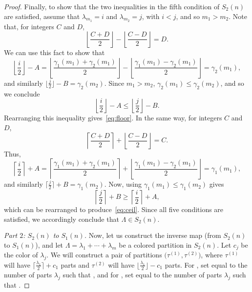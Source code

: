 \documentclass[pdftex]{sigma}
\numberwithin{equation}{section}
\theoremstyle{definition}
\begin{document}
\begin{proof}
Finally, to show that the two inequalities in the fifth condition of $S_2(n)$ are satisfied, assume that $\lambda_{m_1}=i$ and $\lambda_{m_2}=j$, with $i<j$, and so $m_1>m_2$. Note that, for integers $C$ and $D$,
\[ \left\lfloor\frac{C+D}2\right\rfloor-\left\lfloor\frac{C-D}2\right\rfloor=D.\] We can use this fact to show that
\begin{equation*}
\left\lfloor\frac i2\right\rfloor-A=\left\lfloor\frac {\gamma_1(m_1)+\gamma_2(m_1)}2\right\rfloor-\left\lfloor\frac {\gamma_1(m_1)-\gamma_2(m_1)}2\right\rfloor=\gamma_2(m_1),
\end{equation*}
and similarly $\bigl\lfloor\frac j2\bigr\rfloor-B=\gamma_2(m_2)$. Since $m_1>m_2$, $\gamma_2(m_1)\le\gamma_2(m_2)$, and so we conclude
\begin{equation*}
\left\lfloor\frac i2\right\rfloor-A\le\left\lfloor\frac j2\right\rfloor-B.
\end{equation*}
Rearranging this inequality gives~\eqref{eq:floor}. In the same way, for integers $C$ and $D$,
\[ \left\lceil\frac{C+D}2\right\rceil+\left\lfloor\frac{C-D}2\right\rfloor=C.\] Thus,
\begin{equation*}
\left\lceil\frac i2\right\rceil+A=\left\lceil\frac{\gamma_1(m_1)+\gamma_2(m_1)}2\right\rceil+\left\lfloor\frac {\gamma_1(m_1)-\gamma_2(m_1)}2\right\rfloor=\gamma_1(m_1),
\end{equation*}
and similarly $\bigl\lceil\frac j2\bigr\rceil+B=\gamma_1(m_2)$. Now, using $\gamma_1(m_1)\le\gamma_1(m_2)$ gives
\begin{equation*}
\left\lceil\frac j2\right\rceil+B \ge \left\lceil\frac i2\right\rceil+A,
\end{equation*}
which can be rearranged to produce~\eqref{eq:ceil}. Since all five conditions are satisfied, we accordingly conclude that $\Lambda \in S_2(n)$.

{\it Part $2$: $S_2(n)$ to $S_1(n)$.} Now, let us construct the inverse map (from $S_2(n)$ to $S_1(n)$), and let $\Lambda=\lambda_1+\cdots+\lambda_m$ be a colored partition in $S_2(n)$. Let $c_j$ be the color of $\lambda_j$. We will construct a pair of partitions $\bigl(\tau^{(1)},\tau^{(2)}\bigr)$, where $\tau^{(1)}$ will have $\bigl\lceil\frac {\lambda_1}2\bigr\rceil+c_1$ parts and $\tau^{(2)}$ will have $\bigl\lfloor\frac {\lambda_1}2\bigr\rfloor-c_1$ parts. For , set  equal to the number of parts $\lambda_j$ such that , and for , set  equal to the number of parts $\lambda_j$ such that .


\end{proof}
\end{document}
